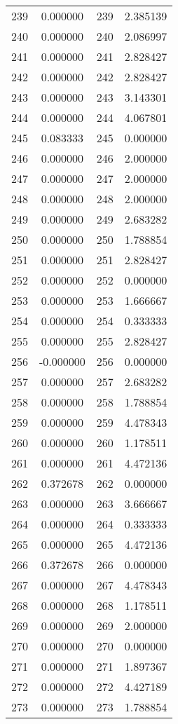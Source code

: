 \documentclass[12pt]{article}
\begin{document}
\begin{longtable}{@{}cccc@{}}
239 & 0.000000 & 239 & 2.385139 \\
240 & 0.000000 & 240 & 2.086997 \\
241 & 0.000000 & 241 & 2.828427 \\
242 & 0.000000 & 242 & 2.828427 \\
243 & 0.000000 & 243 & 3.143301 \\
244 & 0.000000 & 244 & 4.067801 \\
245 & 0.083333 & 245 & 0.000000 \\
246 & 0.000000 & 246 & 2.000000 \\
247 & 0.000000 & 247 & 2.000000 \\
248 & 0.000000 & 248 & 2.000000 \\
249 & 0.000000 & 249 & 2.683282 \\
250 & 0.000000 & 250 & 1.788854 \\
251 & 0.000000 & 251 & 2.828427 \\
252 & 0.000000 & 252 & 0.000000 \\
253 & 0.000000 & 253 & 1.666667 \\
254 & 0.000000 & 254 & 0.333333 \\
255 & 0.000000 & 255 & 2.828427 \\
256 & -0.000000 & 256 & 0.000000 \\
257 & 0.000000 & 257 & 2.683282 \\
258 & 0.000000 & 258 & 1.788854 \\
259 & 0.000000 & 259 & 4.478343 \\
260 & 0.000000 & 260 & 1.178511 \\
261 & 0.000000 & 261 & 4.472136 \\
262 & 0.372678 & 262 & 0.000000 \\
263 & 0.000000 & 263 & 3.666667 \\
264 & 0.000000 & 264 & 0.333333 \\
265 & 0.000000 & 265 & 4.472136 \\
266 & 0.372678 & 266 & 0.000000 \\
267 & 0.000000 & 267 & 4.478343 \\
268 & 0.000000 & 268 & 1.178511 \\
269 & 0.000000 & 269 & 2.000000 \\
270 & 0.000000 & 270 & 0.000000 \\
271 & 0.000000 & 271 & 1.897367 \\
272 & 0.000000 & 272 & 4.427189 \\
273 & 0.000000 & 273 & 1.788854 \\

\end{longtable}
\end{document}
